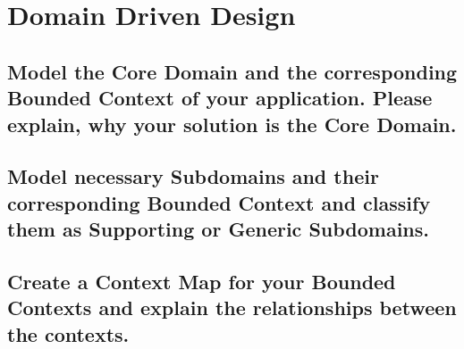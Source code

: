 \section{Domain Driven Design}
	
		\subsection{Model the Core Domain and the corresponding Bounded Context of your
			application. Please explain, why your solution is the Core Domain.}
		
		\subsection{Model necessary Subdomains and their corresponding Bounded Context and
			classify them as Supporting or Generic Subdomains.}
		
		\subsection{Create a Context Map for your Bounded Contexts and explain the relationships
			between the contexts.}